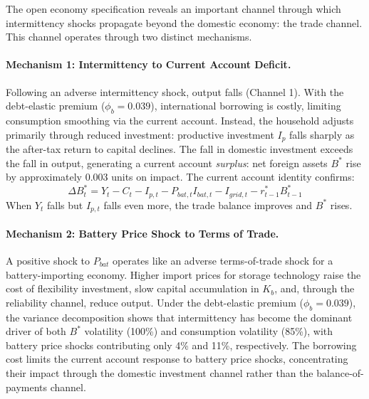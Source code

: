 \documentclass[12pt, a4paper]{article}
\begin{document}
	The open economy specification reveals an important channel through which intermittency shocks propagate beyond the domestic economy: the trade channel. This channel operates through two distinct mechanisms.

	\paragraph{Mechanism 1: Intermittency to Current Account Deficit.} Following an adverse intermittency shock, output falls (Channel 1). With the debt-elastic premium ($\phi_b = 0.039$), international borrowing is costly, limiting consumption smoothing via the current account. Instead, the household adjusts primarily through reduced investment: productive investment $I_p$ falls sharply as the after-tax return to capital declines. The fall in domestic investment exceeds the fall in output, generating a current account \textit{surplus}: net foreign assets $B^*$ rise by approximately 0.003 units on impact. The current account identity confirms:
	\begin{equation*}
		\Delta B^*_t = Y_t - C_t - I_{p,t} - P_{bat,t} I_{bat,t} - I_{grid,t} - r^*_{t-1} B^*_{t-1}
	\end{equation*}
	When $Y_t$ falls but $I_{p,t}$ falls even more, the trade balance improves and $B^*$ rises.

	\paragraph{Mechanism 2: Battery Price Shock to Terms of Trade.} A positive shock to $P_{bat}$ operates like an adverse terms-of-trade shock for a battery-importing economy. Higher import prices for storage technology raise the cost of flexibility investment, slow capital accumulation in $K_b$, and, through the reliability channel, reduce output. Under the debt-elastic premium ($\phi_b = 0.039$), the variance decomposition shows that intermittency has become the dominant driver of both $B^*$ volatility (100\%) and consumption volatility (85\%), with battery price shocks contributing only 4\% and 11\%, respectively. The borrowing cost limits the current account response to battery price shocks, concentrating their impact through the domestic investment channel rather than the balance-of-payments channel.
\end{document}
